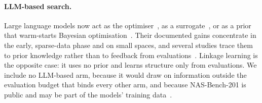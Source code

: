 
\paragraph{LLM-based search.} Large language models now act as the optimiser~\citep{zheng2023genius,nasir2024llmatic},
as a surrogate~\citep{hao2024llmsurrogate,jawahar2024llmpp}, or as a prior that warm-starts Bayesian
optimisation~\citep{liu2024llambo,zhang2024llmhpo}. Their documented gains concentrate in the early, sparse-data phase
and on small spaces, and several studies trace them to prior knowledge rather than to feedback from
evaluations~\citep{kristiadi2024sober,gupta2025llmbo,ferreira2026centaur}. Linkage learning is the opposite case: it
uses no prior and learns structure only from evaluations. We include no LLM-based arm, because it would draw on
information outside the evaluation budget that binds every other arm, and because NAS-Bench-201 is public and may be
part of the models' training data~\citep{zheng2023genius}.
